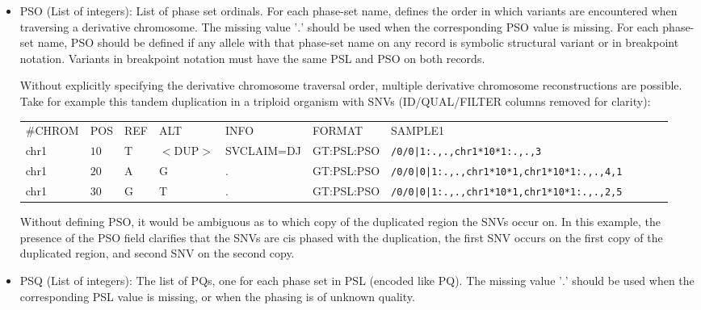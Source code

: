 \documentclass[8pt]{article}
\begin{document}
\begin{itemize}
  \item PSO (List of integers): List of phase set ordinals.
  For each phase-set name, defines the order in which variants are encountered when traversing a derivative chromosome.
  The missing value '$.$' should be used when the corresponding PSO value is missing.
  For each phase-set name, PSO should be defined if any allele with that phase-set name on any record is symbolic structural variant or in breakpoint notation.
  Variants in breakpoint notation must have the same PSL and PSO on both records.
  
  Without explicitly specifying the derivative chromosome traversal order, multiple derivative chromosome reconstructions are possible.
  Take for example this tandem duplication in a triploid organism with SNVs (ID/QUAL/FILTER columns removed for clarity):
  
  \vspace{0.5em}
  \begin{tabular}{ l l l l l l l l l l}
  \#CHROM & POS & REF & ALT & INFO & FORMAT & SAMPLE1\\
    chr1 & $10$ & T & $<$DUP$>$ & SVCLAIM=DJ & GT:PSL:PSO & \tt{/0/0|1:.,.,chr1*10*1:.,.,3}\\
    chr1 & $20$ & A & G & . & GT:PSL:PSO & \tt{/0/0|0|1:.,.,chr1*10*1,chr1*10*1:.,.,4,1} \\
    chr1 & $30$ & G & T & . & GT:PSL:PSO & \tt{/0/0|0|1:.,.,chr1*10*1,chr1*10*1:.,.,2,5} \\
  \end{tabular}
  
  Without defining PSO, it would be ambiguous as to which copy of the duplicated region the SNVs occur on.
  In this example, the presence of the PSO field clarifies that the SNVs are cis phased with the duplication, the first SNV occurs on the first copy of the duplicated region, and second SNV on the second copy.
  
  \item PSQ (List of integers): The list of PQs, one for each phase set in PSL (encoded like PQ). 
  The missing value '$.$' should be used when the corresponding PSL value is missing, or when the phasing is of unknown quality.
\end{itemize}
\end{document}
